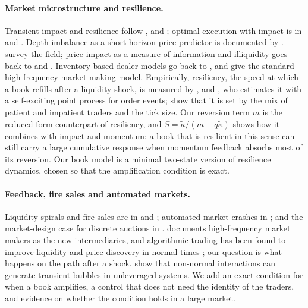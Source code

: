 \paragraph{Market microstructure and resilience.} Transient impact and resilience follow \citet{p2:obizhaeva2013}, \citet{p2:bouchaud2004} and \citet{p2:bouchaud2018}; optimal execution with impact is in \citet{p2:almgren2001} and \citet{p2:cartea2015}. Depth imbalance as a short-horizon price predictor is documented by \citet{p2:cont2014}. \citet{p2:biais2005} survey the field; price impact as a measure of information and illiquidity goes back to \citet{p2:kyle1985} and \citet{p2:amihud2002}. Inventory-based dealer models go back to \citet{p2:ho1981}, and \citet{p2:avellaneda2008} give the standard high-frequency market-making model. Empirically, resiliency, the speed at which a book refills after a liquidity shock, is measured by \citet{p2:biais1995}, \citet{p2:degryse2005} and \citet{p2:large2007}, who estimates it with a self-exciting point process for order events; \citet{p2:foucault2005} show that it is set by the mix of patient and impatient traders and the tick size. Our reversion term $m$ is the reduced-form counterpart of resiliency, and $S=\tilde\kappa/(m-q\tilde\kappa)$ shows how it combines with impact and momentum: a book that is resilient in this sense can still carry a large cumulative response when momentum feedback absorbs most of its reversion. Our book model is a minimal two-state version of resilience dynamics, chosen so that the amplification condition is exact.

\paragraph{Feedback, fire sales and automated markets.} Liquidity spirals and fire sales are in \citet{p2:shleifer1992} and \citet{p2:brunnermeier2009}; automated-market crashes in \citet{p2:kirilenko2017}; and the market-design case for discrete auctions in \citet{p2:budish2015}. \citet{p2:menkveld2013} documents high-frequency market makers as the new intermediaries, and algorithmic trading has been found to improve liquidity and price discovery in normal times \citep{p2:hendershott2011,p2:brogaard2014}; our question is what happens on the path after a shock. \citet{p2:sornette2023} show that non-normal interactions can generate transient bubbles in unleveraged systems. We add an exact condition for when a book amplifies, a control that does not need the identity of the traders, and evidence on whether the condition holds in a large market.

